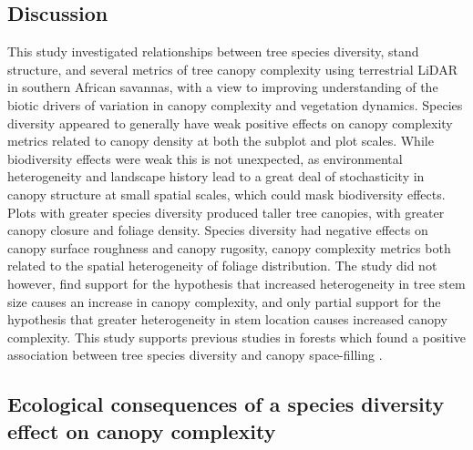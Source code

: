 \begin{refsection}
\section{Discussion}
\label{tls:sec:discussion}

This study investigated relationships between tree species diversity, stand structure, and several metrics of tree canopy complexity using terrestrial LiDAR in southern African savannas, with a view to improving understanding of the biotic drivers of variation in canopy complexity and vegetation dynamics. Species diversity appeared to generally have weak positive effects on canopy complexity metrics related to canopy density at both the subplot and plot scales. While biodiversity effects were weak this is not unexpected, as environmental heterogeneity and landscape history lead to a great deal of stochasticity in canopy structure at small spatial scales, which could mask biodiversity effects. Plots with greater species diversity produced taller tree canopies, with greater canopy closure and foliage density. Species diversity had negative effects on canopy surface roughness and canopy rugosity, canopy complexity metrics both related to the spatial heterogeneity of foliage distribution. The study did not however, find support for the hypothesis that increased heterogeneity in tree stem size causes an increase in canopy complexity, and only partial support for the hypothesis that greater heterogeneity in stem location causes increased canopy complexity. This study supports previous studies in forests which found a positive association between tree species diversity and canopy space-filling \citep{Seidel2013, Shirima2015b}.

\subsection{Ecological consequences of a species diversity effect on canopy complexity}
\label{tls:ssec:ecology}


\end{refsection}
